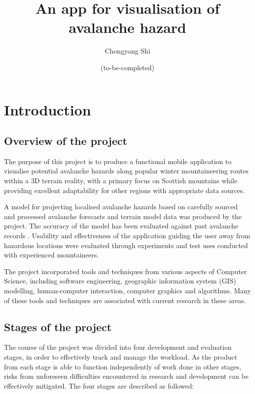 \documentclass[openany]{UoYCSproject}
\title{An app for visualisation of avalanche hazard}
\author{Chongyang Shi}
\date{(to-be-completed)}
\begin{document}
{\let\cleardoublepage\clearpage 
    \maketitle
}

\chapter{Introduction}

\section{Overview of the project}

The purpose of this project is to produce a functional mobile application to visualise potential avalanche hazards along popular winter mountaineering routes within a 3D terrain reality, with a primary focus on Scottish mountains while providing excellent adaptability for other regions with appropriate data sources. 

A model for projecting localised avalanche hazards based on carefully sourced and processed avalanche forecasts \cite{sais} and terrain model data \cite{os-5} was produced by the project. The accuracy of the model has been evaluated against past avalanche records \cite[pp. 143-151]{scottish-avalanches}\cite{sais-map}. Usability and effectiveness of the application guiding the user away from hazardous locations were evaluated through experiments and test uses conducted with experienced mountaineers.

The project incorporated tools and techniques from various aspects of Computer Science, including software engineering, geographic information system (GIS) modelling, human-computer interaction, computer graphics and algorithms. Many of these tools and techniques are associated with current research in these areas.

\section{Stages of the project}

The course of the project was divided into four development and evaluation stages, in order to effectively track and manage the workload. As the product from each stage is able to function independently of work done in other stages, risks from unforeseen difficulties encountered in research and development can be effectively mitigated. The four stages are described as followed:
\end{document}
